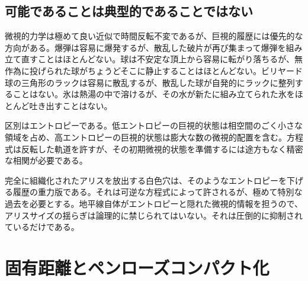 \subsection{可能であることは典型的であることではない}

微視的力学は極めて良い近似で時間反転不変であるが、巨視的履歴には優先的な方向がある。爆弾は容易に爆発するが、散乱した破片が再び集まって爆弾を組み立て直すことはほとんどない。球は不安定な頂上から容易に転がり落ちるが、無作為に投げられた球がちょうどそこに静止することはほとんどない。ビリヤード球の三角形のラックは容易に散乱するが、散乱した球が自発的にラックに整列することはない。氷は熱湯の中で溶けるが、その水が新たに組み立てられた氷をほとんど吐き出すことはない。

区別はエントロピーである。低エントロピーの巨視的状態は相空間のごく小さな領域を占め、高エントロピーの巨視的状態は膨大な数の微視的配置を含む。方程式は反転した軌道を許すが、その初期微視的状態を準備するには途方もなく精密な相関が必要である。

\begin{classroomqa}
\end{classroomqa}

完全に組織化されたアリスを放出する白色穴は、そのようなエントロピーを下げる履歴の重力版である。それは可逆な方程式によって許されるが、極めて特別な過去を必要とする。地平線自体がエントロピーと隠れた微視的情報を担うので、アリスサイズの揺らぎは論理的に禁じられてはいない。それは圧倒的に抑制されているだけである。

\begin{classroomqa}
\end{classroomqa}

\section{固有距離とペンローズコンパクト化}


